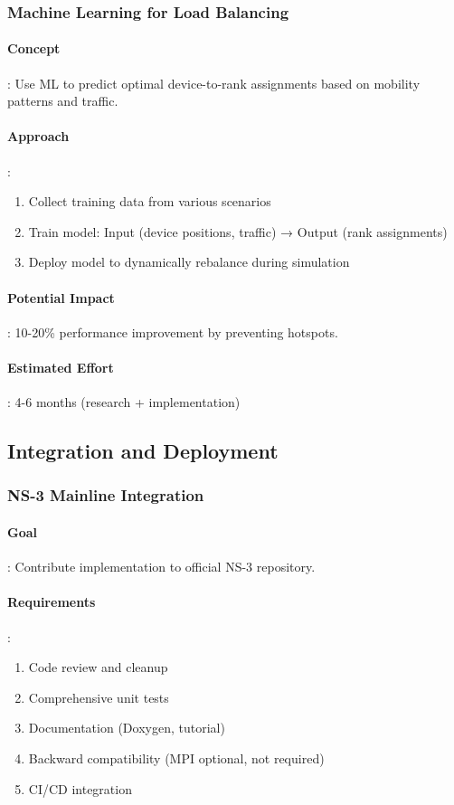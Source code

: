 \subsubsection{Machine Learning for Load Balancing}

\paragraph{Concept}:
Use ML to predict optimal device-to-rank assignments based on mobility patterns and traffic.

\paragraph{Approach}:
\begin{enumerate}
    \item Collect training data from various scenarios
    \item Train model: Input (device positions, traffic) → Output (rank assignments)
    \item Deploy model to dynamically rebalance during simulation
\end{enumerate}

\paragraph{Potential Impact}:
10-20\% performance improvement by preventing hotspots.

\paragraph{Estimated Effort}: 4-6 months (research + implementation)

\subsection{Integration and Deployment}

\subsubsection{NS-3 Mainline Integration}

\paragraph{Goal}:
Contribute implementation to official NS-3 repository.

\paragraph{Requirements}:
\begin{enumerate}
    \item Code review and cleanup
    \item Comprehensive unit tests
    \item Documentation (Doxygen, tutorial)
    \item Backward compatibility (MPI optional, not required)
    \item CI/CD integration
\end{enumerate}


